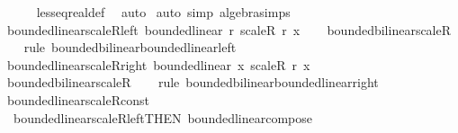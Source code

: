 \begin{isabellebody}
\ \ \ \ \isamarkupfalse%
\ less{\isacharunderscore}{\kern0pt}eq{\isacharunderscore}{\kern0pt}real{\isacharunderscore}{\kern0pt}def\ \isamarkupfalse%
\ auto\isanewline
{}\isamarkupfalse%
\ {\isacharparenleft}{\kern0pt}auto\ simp{\isacharcolon}{\kern0pt}\ algebra{\isacharunderscore}{\kern0pt}simps{\isacharparenright}{\kern0pt}%
\endisatagproof
{\isafoldproof}%
%
\isadelimproof
\isanewline
%
\endisadelimproof
\isanewline
{}\isamarkupfalse%
\ bounded{\isacharunderscore}{\kern0pt}linear{\isacharunderscore}{\kern0pt}scaleR{\isacharunderscore}{\kern0pt}left{\isacharcolon}{\kern0pt}\ {\isachardoublequoteopen}bounded{\isacharunderscore}{\kern0pt}linear\ {\isacharparenleft}{\kern0pt}{\isasymlambda}r{\isachardot}{\kern0pt}\ scaleR\ r\ x{\isacharparenright}{\kern0pt}{\isachardoublequoteclose}\isanewline
%
\isadelimproof
\ \ %
\endisadelimproof
%
\isatagproof
{}\isamarkupfalse%
\ bounded{\isacharunderscore}{\kern0pt}bilinear{\isacharunderscore}{\kern0pt}scaleR\isanewline
\ \ \isamarkupfalse%
\ {\isacharparenleft}{\kern0pt}rule\ bounded{\isacharunderscore}{\kern0pt}bilinear{\isachardot}{\kern0pt}bounded{\isacharunderscore}{\kern0pt}linear{\isacharunderscore}{\kern0pt}left{\isacharparenright}{\kern0pt}%
\endisatagproof
{\isafoldproof}%
%
\isadelimproof
\isanewline
%
\endisadelimproof
\isanewline
{}\isamarkupfalse%
\ bounded{\isacharunderscore}{\kern0pt}linear{\isacharunderscore}{\kern0pt}scaleR{\isacharunderscore}{\kern0pt}right{\isacharcolon}{\kern0pt}\ {\isachardoublequoteopen}bounded{\isacharunderscore}{\kern0pt}linear\ {\isacharparenleft}{\kern0pt}{\isasymlambda}x{\isachardot}{\kern0pt}\ scaleR\ r\ x{\isacharparenright}{\kern0pt}{\isachardoublequoteclose}\isanewline
%
\isadelimproof
\ \ %
\endisadelimproof
%
\isatagproof
{}\isamarkupfalse%
\ bounded{\isacharunderscore}{\kern0pt}bilinear{\isacharunderscore}{\kern0pt}scaleR\isanewline
\ \ \isamarkupfalse%
\ {\isacharparenleft}{\kern0pt}rule\ bounded{\isacharunderscore}{\kern0pt}bilinear{\isachardot}{\kern0pt}bounded{\isacharunderscore}{\kern0pt}linear{\isacharunderscore}{\kern0pt}right{\isacharparenright}{\kern0pt}%
\endisatagproof
{\isafoldproof}%
%
\isadelimproof
\isanewline
%
\endisadelimproof
\isanewline
{}\isamarkupfalse%
\ bounded{\isacharunderscore}{\kern0pt}linear{\isacharunderscore}{\kern0pt}scaleR{\isacharunderscore}{\kern0pt}const\ {\isacharequal}{\kern0pt}\isanewline
\ \ bounded{\isacharunderscore}{\kern0pt}linear{\isacharunderscore}{\kern0pt}scaleR{\isacharunderscore}{\kern0pt}left{\isacharbrackleft}{\kern0pt}THEN\ bounded{\isacharunderscore}{\kern0pt}linear{\isacharunderscore}{\kern0pt}compose{\isacharbrackright}{\kern0pt}\isanewline

\end{isabellebody}
